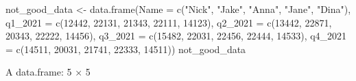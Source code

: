 \documentclass[
  letterpaper,
  DIV=11,
  numbers=noendperiod]{scrreprt}
\newenvironment{Shaded}{\begin{snugshade}}{\end{snugshade}}
\newcommand{\AttributeTok}[1]{\textcolor[rgb]{0.40,0.45,0.13}{#1}}
\newcommand{\DecValTok}[1]{\textcolor[rgb]{0.68,0.00,0.00}{#1}}
\newcommand{\FunctionTok}[1]{\textcolor[rgb]{0.28,0.35,0.67}{#1}}
\newcommand{\NormalTok}[1]{\textcolor[rgb]{0.00,0.23,0.31}{#1}}
\newcommand{\OtherTok}[1]{\textcolor[rgb]{0.00,0.23,0.31}{#1}}
\newcommand{\StringTok}[1]{\textcolor[rgb]{0.13,0.47,0.30}{#1}}
\begin{document}
\begin{Shaded}
\begin{Highlighting}[]
\NormalTok{not\_good\_data }\OtherTok{\textless{}{-}} \FunctionTok{data.frame}\NormalTok{(}\AttributeTok{Name =} \FunctionTok{c}\NormalTok{(}\StringTok{"Nick"}\NormalTok{, }\StringTok{"Jake"}\NormalTok{, }\StringTok{"Anna"}\NormalTok{, }\StringTok{"Jane"}\NormalTok{, }\StringTok{"Dina"}\NormalTok{),}
                           \AttributeTok{q1\_2021 =} \FunctionTok{c}\NormalTok{(}\DecValTok{12442}\NormalTok{, }\DecValTok{22131}\NormalTok{, }\DecValTok{21343}\NormalTok{, }\DecValTok{22111}\NormalTok{, }\DecValTok{14123}\NormalTok{),}
                           \AttributeTok{q2\_2021 =} \FunctionTok{c}\NormalTok{(}\DecValTok{13442}\NormalTok{, }\DecValTok{22871}\NormalTok{, }\DecValTok{20343}\NormalTok{, }\DecValTok{22222}\NormalTok{, }\DecValTok{14456}\NormalTok{),}
                           \AttributeTok{q3\_2021 =} \FunctionTok{c}\NormalTok{(}\DecValTok{15482}\NormalTok{, }\DecValTok{22031}\NormalTok{, }\DecValTok{22456}\NormalTok{, }\DecValTok{22444}\NormalTok{, }\DecValTok{14533}\NormalTok{),}
                           \AttributeTok{q4\_2021 =} \FunctionTok{c}\NormalTok{(}\DecValTok{14511}\NormalTok{, }\DecValTok{20031}\NormalTok{, }\DecValTok{21741}\NormalTok{, }\DecValTok{22333}\NormalTok{, }\DecValTok{14511}\NormalTok{))}
\NormalTok{not\_good\_data}
\end{Highlighting}
\end{Shaded}

A data.frame: 5 × 5
\end{document}
